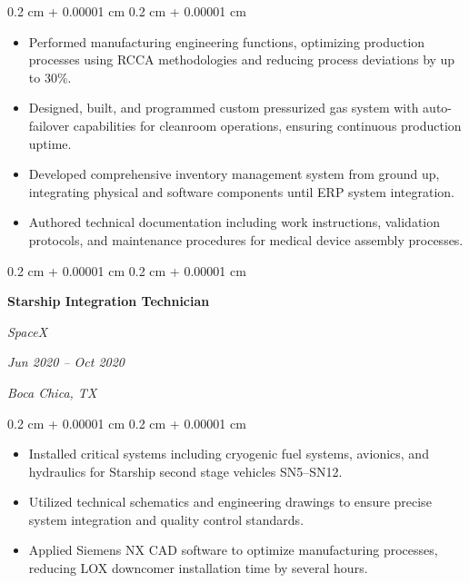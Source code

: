 \documentclass[10pt, letterpaper]{article}
\newenvironment{highlights}{
    \begin{itemize}[
        topsep=0.10 cm,
        parsep=0.10 cm,
        partopsep=0pt,
        itemsep=0pt,
        leftmargin=0.4 cm + 10pt
    ]
}{
    \end{itemize}
} %
\newenvironment{onecolentry}{
    \begin{adjustwidth}{
        0.2 cm + 0.00001 cm
    }{
        0.2 cm + 0.00001 cm
    }
}{
    \end{adjustwidth}
} %
\newenvironment{twocolentry}[2][]{
    \onecolentry
    \def\secondColumn{#2}
    \setcolumnwidth{\fill, 5.0 cm}
    \begin{paracol}{2}
}{
    \switchcolumn \raggedleft \secondColumn
    \end{paracol}
    \endonecolentry
} %
\begin{document}
        \vspace{0.10 cm}
        \begin{onecolentry}
            \begin{highlights}
                \item Performed manufacturing engineering functions, optimizing production processes using RCCA methodologies and reducing process deviations by up to 30\%.
                \item Designed, built, and programmed custom pressurized gas system with auto-failover capabilities for cleanroom operations, ensuring continuous production uptime.
                \item Developed comprehensive inventory management system from ground up, integrating physical and software components until ERP system integration.
                \item Authored technical documentation including work instructions, validation protocols, and maintenance procedures for medical device assembly processes.
            \end{highlights}
        \end{onecolentry}

        \vspace{0.35 cm}

        \begin{twocolentry}{
        \textit{Jun 2020 – Oct 2020}
        
        \textit{Boca Chica, TX}}
            \textbf{Starship Integration Technician}
            
            \textit{SpaceX}
        \end{twocolentry}

        \vspace{0.10 cm}
        \begin{onecolentry}
            \begin{highlights}
                \item Installed critical systems including cryogenic fuel systems, avionics, and hydraulics for Starship second stage vehicles SN5–SN12.
                \item Utilized technical schematics and engineering drawings to ensure precise system integration and quality control standards.
                \item Applied Siemens NX CAD software to optimize manufacturing processes, reducing LOX downcomer installation time by several hours.
            \end{highlights}
        \end{onecolentry}
\end{document}
